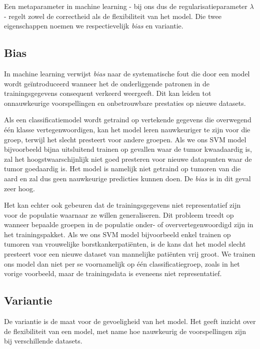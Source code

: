 \documentclass[twoside, kulak]{kulakreport}
\begin{document}
	Een metaparameter in machine learning - bij ons dus de regularisatieparameter \(\lambda\) - regelt zowel de correctheid als de flexibiliteit van het model. Die twee eigenschappen noemen we respectievelijk \textit{bias} en variantie.
	
	\subsection{Bias}
	
	In machine learning verwijst \textit{bias} naar de systematische fout die door een model wordt geïntroduceerd wanneer het de onderliggende patronen in de trainingsgegevens consequent verkeerd weergeeft. Dit kan leiden tot onnauwkeurige voorspellingen en onbetrouwbare prestaties op nieuwe datasets. 
	
	\newpage
	
	Als een classificatiemodel wordt getraind op vertekende gegevens die overwegend één klasse vertegenwoordigen, kan het model leren nauwkeuriger te zijn voor die groep, terwijl het slecht presteert voor andere groepen. Als we ons SVM model bijvoorbeeld bijna uitsluitend trainen op gevallen waar de tumor kwaadaardig is, zal het hoogstwaarschijnlijk niet goed presteren voor nieuwe datapunten waar de tumor goedaardig is. Het model is namelijk niet getraind op tumoren van die aard en zal dus geen nauwkeurige predicties kunnen doen. De \textit{bias} is in dit geval zeer hoog.
	
	Het kan echter ook gebeuren dat de trainingsgegevens niet representatief zijn voor de populatie waarnaar ze willen generaliseren. Dit probleem treedt op wanneer bepaalde groepen in de populatie onder- of oververtegenwoordigd zijn in het trainingspakket. Als we ons SVM model bijvoorbeeld enkel trainen op tumoren van vrouwelijke borstkankerpatiënten, is de kans dat het model slecht presteert voor een nieuwe dataset van mannelijke patiënten vrij groot. We trainen ons model dan niet per se voornamelijk op één classificatiegroep, zoals in het vorige voorbeeld, maar de trainingsdata is eveneens niet representatief.
	
	\subsection{Variantie}
	
	De variantie is de maat voor de gevoeligheid van het model. Het geeft inzicht over de flexibiliteit van een model, met name hoe nauwkeurig de voorspellingen zijn bij verschillende datasets.
	
\end{document}

